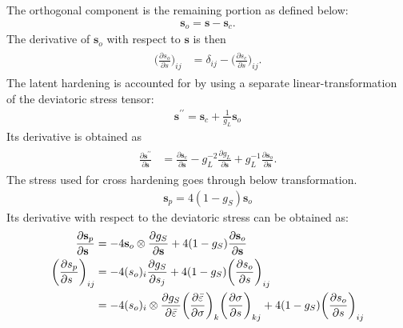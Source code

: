 \documentclass[12pt]{amsart}
\begin{document}
The orthogonal component is the remaining portion as defined below:
\begin{eqnarray}
  \label{eq:decomp3}
  \mathbf{s}_o = \mathbf{s} - \mathbf{s}_c.
\end{eqnarray}
The derivative of $\mathbf{s}_o$ with respect to $\mathbf{s}$ is then
\begin{eqnarray}
  \label{eq:decomp4}
  \begin{split}
    \bigg(\frac{\partial s_o}{\partial s}\bigg)_{ij} &= \delta_{ij}- \bigg(\frac{\partial s_c}{\partial s}\bigg)_{ij}.
  \end{split}
\end{eqnarray}
The latent hardening is accounted for by using a separate linear-transformation of the deviatoric stress tensor:
\begin{eqnarray}
  \label{eq:latent_decompose1}
  \mathbf{s}^{\prime\prime}=\mathbf{s}_c+\frac{1}{g_L}\mathbf{s}_o
\end{eqnarray}
Its derivative is obtained as
\begin{eqnarray}
  \begin{split}
    \label{eq:latent_decompose2}
    \frac{\partial\mathbf{s}^{\prime\prime}}{\partial\mathbf{s}} &=\frac{\partial\mathbf{s}_c}{\partial\mathbf{s}}-g_L^{-2}\frac{\partial g_L}{\partial \mathbf{s}} +g_L^{-1} \frac{\partial\mathbf{s}_o}{\partial\mathbf{s}}.
  \end{split}
\end{eqnarray}
The stress used for cross hardening goes through below transformation.
\begin{eqnarray}
  \label{eq:cross_linear1}
  \mathbf{s}_p = 4(1-g_S)\mathbf{s}_o
\end{eqnarray}
Its derivative with respect to the deviatoric stress can be obtained as:
\begin{eqnarray}
  \begin{split}
    \label{eq:cross_linear2}
    \frac{\partial\mathbf{s}_p}{\partial\mathbf{s}\hfill}  &= -4\mathbf{s}_o\otimes\frac{\partial g_S}{\partial \mathbf{s}}+4(1-g_S) \frac{\partial\mathbf{s}_o}{\partial\mathbf{s}} \\
    \bigg(\frac{\partial s_p}{\partial s\hfill} \bigg)_{ij} &= -4(s_o)_i\frac{\partial g_S}{\partial s_j} + 4(1-g_S) \bigg(\frac{\partial s_o}{\partial s}\bigg)_{ij}\\
    &= -4(s_o)_i\otimes\frac{\partial g_S}{\partial \bar{\varepsilon}}\bigg(\frac{\partial\bar{\varepsilon}}{\partial\sigma}\bigg)_k\bigg(\frac{\partial\sigma}{\partial s}\bigg)_{kj} + 4(1-g_S) \bigg(\frac{\partial s_o}{\partial s}\bigg)_{ij}
  \end{split}
\end{eqnarray}
\end{document}
